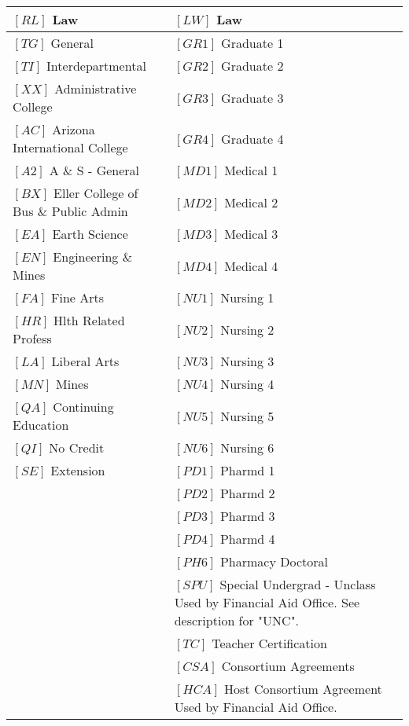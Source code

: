 \documentclass[12pt,notitlepage]{article}
\begin{document}
{\begin{tabular}{|p{7cm}|p{7cm}|}
$\left[ RL \right]$ Law & $\left[ LW \right]$ Law 				\\
\hline
$\left[ TG \right]$ General & $\left[ GR1 \right]$ Graduate 1 		\\		
\hline
$\left[ TI \right]$ Interdepartmental & $\left[ GR2 \right]$ Graduate 2 	\\			
\hline
$\left[ XX \right]$ Administrative College & $\left[ GR3 \right]$ Graduate 3 	\\			
\hline
$\left[ AC \right]$ Arizona International College & $\left[ GR4 \right]$ Graduate 4 	\\			
\hline
$\left[ A2 \right]$ A \& S - General & $\left[ MD1 \right]$ Medical 1 				\\
\hline
$\left[ BX \right]$ Eller College of Bus \& Public Admin & $\left[ MD2 \right]$ Medical 2 \\				
\hline
$\left[ EA \right]$ Earth Science & $\left[ MD3 \right]$ Medical 3 				\\
\hline
$\left[ EN \right]$ Engineering \& Mines & $\left[ MD4 \right]$ Medical 4 			\\	
\hline
$\left[ FA \right]$ Fine Arts & $\left[ NU1 \right]$ Nursing 1 				\\
\hline
$\left[ HR \right]$ Hlth Related Profess & $\left[ NU2 \right]$ Nursing 2 		\\		
\hline
$\left[ LA \right]$ Liberal Arts & $\left[ NU3 \right]$ Nursing 3 				\\
\hline
$\left[ MN \right]$ Mines & $\left[ NU4 \right]$ Nursing 4 				\\
\hline
$\left[ QA \right]$ Continuing Education & $\left[ NU5 \right]$ Nursing 5\\ 				
\hline
$\left[ QI \right]$ No Credit & $\left[ NU6 \right]$ Nursing 6 				\\
\hline$\left[ SE \right]$ Extension 	& $\left[ PD1 \right]$ Pharmd 1 \\
&	$\left[ PD2 \right]$ Pharmd 2 \\
&	$\left[ PD3 \right]$ Pharmd 3 	\\			
&	$\left[ PD4 \right]$ Pharmd 4 				\\
&	$\left[ PH6 \right]$ Pharmacy Doctoral\\ 				
&	$\left[ SPU \right]$ Special Undergrad - Unclass 	
	Used by Financial Aid Office. See description for "UNC".\\ 				
&	$\left[ TC \right]$ Teacher Certification 			\\	
&	$\left[ CSA \right]$ Consortium Agreements 				\\
&	$\left[ HCA \right]$ Host Consortium Agreement 				
	Used by Financial Aid Office. 				\\
\hline
\end{tabular}
}
\end{document}
